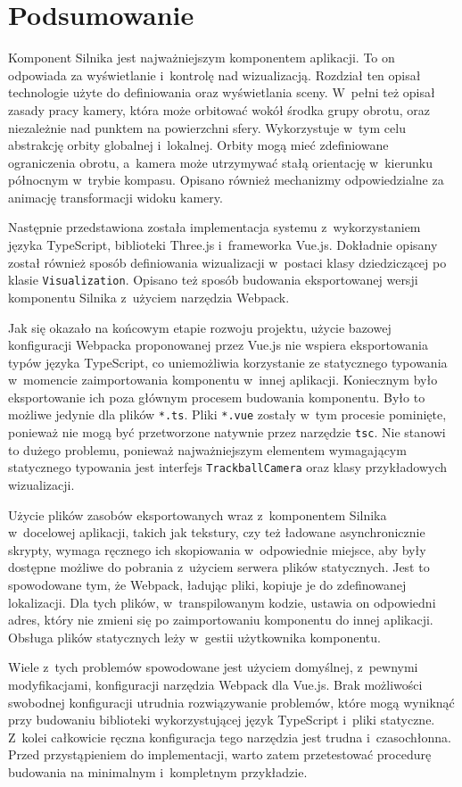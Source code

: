 \section{Podsumowanie}

Komponent Silnika jest najważniejszym komponentem aplikacji. To on odpowiada za wyświetlanie i~kontrolę nad wizualizacją. Rozdział ten opisał technologie użyte do definiowania oraz wyświetlania sceny. W~pełni też opisał zasady pracy kamery, która może orbitować wokół środka grupy obrotu, oraz niezależnie nad punktem na powierzchni sfery. Wykorzystuje w~tym celu abstrakcję orbity globalnej i~lokalnej. Orbity mogą mieć zdefiniowane ograniczenia obrotu, a~kamera może utrzymywać stałą orientację w~kierunku północnym w~trybie kompasu. Opisano również mechanizmy odpowiedzialne za animację transformacji widoku kamery.

Następnie przedstawiona została implementacja systemu z~wykorzystaniem języka TypeScript, biblioteki Three.js i~frameworka Vue.js. Dokładnie opisany został również sposób definiowania wizualizacji w~postaci klasy dziedziczącej po klasie \texttt{Visualization}. Opisano też sposób budowania eksportowanej wersji komponentu Silnika z~użyciem narzędzia Webpack.

Jak się okazało na końcowym etapie rozwoju projektu, użycie bazowej konfiguracji Webpacka proponowanej przez Vue.js nie wspiera eksportowania typów języka TypeScript, co uniemożliwia korzystanie ze statycznego typowania w~momencie zaimportowania komponentu w~innej aplikacji. Koniecznym było eksportowanie ich poza głównym procesem budowania komponentu. Było to możliwe jedynie dla plików \texttt{*.ts}. Pliki \texttt{*.vue} zostały w~tym procesie pominięte, ponieważ nie mogą być przetworzone natywnie przez narzędzie \texttt{tsc}. Nie stanowi to dużego problemu, ponieważ najważniejszym elementem wymagającym statycznego typowania jest interfejs \texttt{TrackballCamera} oraz klasy przykładowych wizualizacji.

Użycie plików zasobów eksportowanych wraz z~komponentem Silnika w~docelowej aplikacji, takich jak tekstury, czy też ładowane asynchronicznie skrypty, wymaga ręcznego ich skopiowania w~odpowiednie miejsce, aby były dostępne możliwe do pobrania z~użyciem serwera plików statycznych. Jest to spowodowane tym, że Webpack, ładując pliki, kopiuje je do zdefinowanej lokalizacji. Dla tych plików, w~transpilowanym kodzie, ustawia on odpowiedni adres, który nie zmieni się po zaimportowaniu komponentu do innej aplikacji. Obsługa plików statycznych leży w~gestii użytkownika komponentu.

Wiele z~tych problemów spowodowane jest użyciem domyślnej, z~pewnymi modyfikacjami, konfiguracji narzędzia Webpack dla Vue.js. Brak możliwości swobodnej konfiguracji utrudnia rozwiązywanie problemów, które mogą wyniknąć przy budowaniu biblioteki wykorzystującej język TypeScript i~pliki statyczne. Z~kolei całkowicie ręczna konfiguracja tego narzędzia jest trudna i~czasochłonna. Przed przystąpieniem do implementacji, warto zatem przetestować procedurę budowania na minimalnym i~kompletnym przykładzie.
